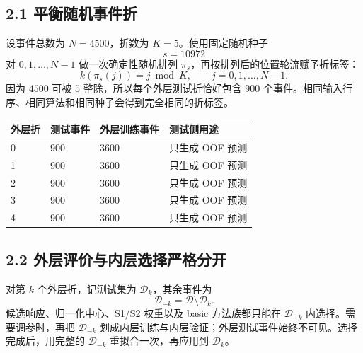 \documentclass[UTF8,11pt,a4paper,oneside,fontset=none]{ctexart}
\begin{document}
\subsection*{2.1 平衡随机事件折}

设事件总数为 $N=4500$，折数为 $K=5$。使用固定随机种子
\begin{equation}
  s=10972
\end{equation}
对 $0,1,\ldots,N-1$ 做一次确定性随机排列 $\pi_s$，再按排列后的位置轮流赋予折标签：
\begin{equation}
  k\!\left(\pi_s(j)\right)=j\bmod K,
  \qquad j=0,1,\ldots,N-1.
\end{equation}
因为 $4500$ 可被 $5$ 整除，所以每个外层测试折恰好包含 900 个事件。相同输入行序、相同算法和相同种子会得到完全相同的折标签。

\begin{tabularx}{\textwidth}{@{}C{2.0cm} C{3.0cm} C{3.0cm} Y@{}}
\toprule
{}\textbf{外层折} & \textbf{测试事件} & \textbf{外层训练事件} & \textbf{测试侧用途}\\
 & 900 & 3600 & 只生成 OOF 预测\\
1 & 900 & 3600 & 只生成 OOF 预测\\
2 & 900 & 3600 & 只生成 OOF 预测\\
3 & 900 & 3600 & 只生成 OOF 预测\\
4 & 900 & 3600 & 只生成 OOF 预测\\
\bottomrule
\end{tabularx}

\subsection*{2.2 外层评价与内层选择严格分开}

对第 $k$ 个外层折，记测试集为 $\mathcal D_k$，其余事件为
\begin{equation}
  \mathcal D_{-k}=\mathcal D\setminus\mathcal D_k.
\end{equation}
候选响应、归一化中心、S1/S2 权重以及 basic 方法族都只能在 $\mathcal D_{-k}$ 内选择。需要调参时，再把 $\mathcal D_{-k}$ 划成内层训练与内层验证；外层测试事件始终不可见。选择完成后，用完整的 $\mathcal D_{-k}$ 重拟合一次，再应用到 $\mathcal D_k$。
\end{document}
